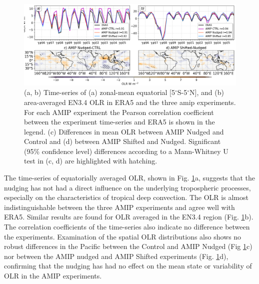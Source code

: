 \begin{figure}[t!]
\centering
 \includegraphics[width=\linewidth]{figures/olr_amip.png}
\caption[OLR time-series and spatial pattern differences in AMIP experiments]{(a, b) Time-series of (a) zonal-mean equatorial [5$^\circ$S-5$^\circ$N], and (b) area-averaged EN3.4 OLR in ERA5 and the three amip experiments. For each AMIP experiment the Pearson correlation coefficient between the experiment time-series and ERA5 is shown in the legend. (c) Differences in mean OLR between AMIP Nudged and Control and (d) between AMIP Shifted and Nudged. Significant (95\% confidence level) differences according to a Mann-Whitney U test in (c, d) are highlighted with hatching. }
\label{fig:olr_amip}
\end{figure}

The time-series of equatorially averaged OLR, shown in Fig. \ref{fig:olr_amip}a, suggests that the nudging has not had a direct influence on the underlying tropospheric processes, especially on the characteristics of tropical deep convection. The OLR is almost indistinguishable between the three AMIP experiments and agree well with ERA5. Similar results are found for OLR averaged in the EN3.4 region (Fig. \ref{fig:olr_amip}b). The correlation coefficients of the time-series also indicate no difference between the experiments. Examination of the spatial OLR distributions also shows no robust differences in the Pacific between the Control and AMIP Nudged (Fig \ref{fig:olr_amip}c) nor between the AMIP nudged and AMIP Shifted experiments (Fig. \ref{fig:olr_amip}d), confirming that the nudging has had no effect on the mean state or variability of OLR in the AMIP experiments. 

